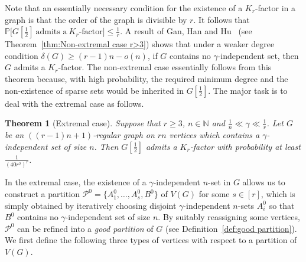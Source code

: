 \documentclass[11pt, a4paper]{article}
\newtheorem{theorem}{Theorem}[section]
\theoremstyle{definition}
\newcommand{\<}{\subseteq}
\begin{document}
Note that an essentially necessary condition for the existence of a $K_r$-factor in a graph is that the order of the graph is divisible by $r$. %
It follows that $\mathbb{P}\big[G[\frac{1}{2}]~\text{admits a}~K_r\text{-factor}\big]\le \frac{1}{r}$. A result of Gan, Han and Hu~\cite{gan2024} (see Theorem~\ref{thm:Non-extremal case r>3}) shows that under a weaker degree condition $\delta(G)\geq (r-1)n - o(n)$, if $G$ contains no $\gamma$-independent set, then $G$ admits a $K_r$-factor. The non-extremal case essentially follows from this theorem because, with high probability, the required minimum degree and the non-existence of sparse sets would be inherited in $G[\frac{1}{2}]$. The major task is to deal with the extremal case as follows.


\begin{theorem}[Extremal case]\label{lem:extremal-case}
Suppose that $r\geq 3$, $n\in \mathbb{N}$   and $\frac{1}{n}\ll \gamma \ll \frac{1}{r}$. Let $G$ be an $((r-1)n+1)$-regular graph on $rn$ vertices which contains a $\gamma$-independent set of size $n$. Then  $G[\frac{1}{2}]$ admits a $K_r$-factor with probability at least $\frac{1}{(40r^2)^r}$.
\end{theorem}
In the extremal case, the existence of a $\gamma$-independent $n$-set in $G$ allows us to construct a partition $\mathcal{P}^0 = \{A_1^0, \dotsc, A_s^0, B^0\}$ of $V(G)$ for some $s\in [r]$, which is simply obtained by iteratively choosing disjoint $\gamma$-independent $n$-sets $A_i^0$ so that $B^0$ contains no $\gamma$-independent set {of size $n$}. 
By suitably reassigning some vertices, $\mathcal{P}^0$ can be refined into a \textit{good partition} of $G$ (see Definition~\ref{def:good partition}).  We first define the following three types of vertices with respect to a partition of $V(G)$.
\end{document}

